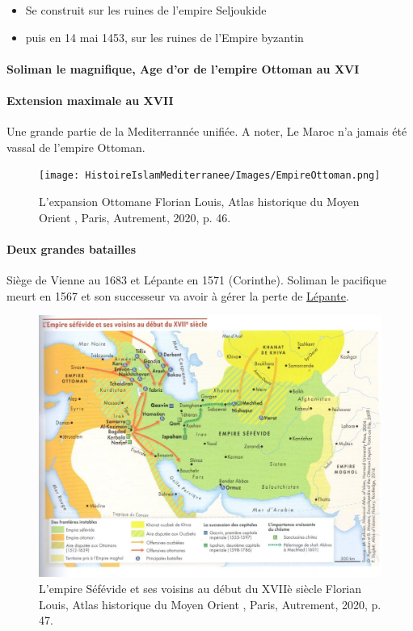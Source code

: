 \begin{itemize}
    \item Se construit sur les ruines de l'empire Seljoukide
    \item puis en 14 mai 1453, sur les ruines de l'Empire byzantin
\end{itemize}

\paragraph{Soliman le magnifique, Age d'or de l'empire Ottoman au XVI}
\paragraph{Extension maximale au XVII} Une grande partie de la Mediterrannée unifiée.
A noter, Le Maroc n'a jamais été vassal de l'empire Ottoman. 

\begin{figure}
    \centering
        \caption{L'expansion Ottomane Florian Louis,
Atlas historique
du Moyen Orient , Paris,
Autrement, 2020, p. 46.}
    \texttt{[image: HistoireIslamMediterranee/Images/EmpireOttoman.png]}

    \label{fig:my_label}
\end{figure}

\paragraph{Deux grandes batailles} Siège de Vienne au 1683 et Lépante en 1571 (Corinthe). Soliman le pacifique meurt en 1567 et son successeur va avoir à gérer la perte de \href{https://fr.wikipedia.org/wiki/Bataille_de_L%C3%A9pante}{Lépante}.

\begin{figure}
    \centering
        \caption{L'empire Séfévide et ses voisins au début du XVIIè siècle Florian Louis,
Atlas historique du
Moyen Orient , Paris, Autrement,
2020, p. 47.}
    \includegraphics[width=\textwidth]{HistoireIslamMediterranee/Images/EmpireSefevide.jpg}

    \label{fig:my_label}
\end{figure}
